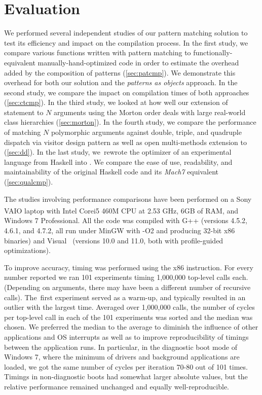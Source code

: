 \section{Evaluation} %
\label{sec:eval}

We performed several independent studies of our pattern matching solution to 
test its efficiency and impact on the compilation process. In the first study, we 
compare various functions written with pattern matching to functionally-equivalent manually-hand-optimized code
in order to estimate the overhead added by the composition of patterns 
(\textsection\ref{sec:patcmp}). We demonstrate this overhead for both our 
solution and the \emph{patterns as objects} approach. In the second study, we compare the
impact on compilation times of both approaches 
(\textsection\ref{sec:ctcmp}). In the third study, we looked at how well our extension  
of  statement to $N$ arguments using the Morton order deals with 
large real-world class hierarchies (\textsection\ref{sec:morton}). In the fourth
study, we compare the performance of matching $N$ polymorphic arguments against 
double, triple, and quadruple dispatch via visitor design pattern as well as 
open multi-methods extension to \Cpp{} (\textsection\ref{sec:dd}). 
In the last study, we~rewrote the optimizer of an experimental language from 
Haskell into \Cpp{}. We compare the ease of use, readability, and maintainability 
of the original Haskell code and its \emph{Mach7} equivalent 
(\textsection\ref{sec:qualcmp}).

The studies involving performance comparisons have been performed on a
Sony VAIO\textsuperscript{\textregistered} laptop with 
Intel\textsuperscript{\textregistered} Core\texttrademark i5 460M CPU at 2.53 
GHz, 6GB of RAM, and Windows 7 Professional. All the code was compiled with G++ 
(versions 4.5.2, 4.6.1, and 4.7.2, all run under MinGW with -O2 and producing 32-bit x86 binaries)
and Visual~\Cpp{} (versions 10.0 and 11.0, both with 
profile-guided optimizations).
 
To improve accuracy, timing was performed using the x86  
instruction. For every number reported we ran 
101 experiments timing 1,000,000 top-level calls each.  (Depending on arguments, 
there may have been a different number of recursive calls). The~first experiment 
served as a warm-up, and typically resulted in an outlier with the largest 
time. Averaged over 1,000,000 calls, the number of cycles per top-level call in 
each of the 101 experiments was sorted and the median was chosen. We preferred the
median to the average to diminish the influence of other applications and OS 
interrupts as well as to improve reproducibility of timings between the
application runs. In particular, in the diagnostic boot mode of Windows 7, where the minimum 
of drivers and background applications are loaded, we got the same number of 
cycles per iteration 70-80 out of 101 times. Timings in non-diagnostic boots had 
somewhat larger absolute values, but the relative performance remained 
unchanged and equally well-reproducible.

